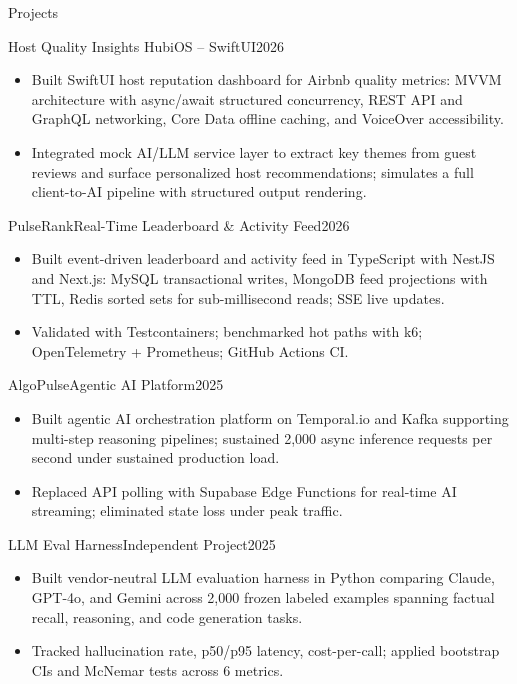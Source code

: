 \documentclass[]{mcdowellcv}
\begin{document}
\begin{cvsection}{Projects}
  \begin{cvsubsection}{Host Quality Insights Hub}{iOS -- SwiftUI}{2026}
    \begin{itemize}
      \item Built SwiftUI host reputation dashboard for Airbnb quality metrics: MVVM architecture with async/await structured concurrency, REST API and GraphQL networking, Core Data offline caching, and VoiceOver accessibility.
      \item Integrated mock AI/LLM service layer to extract key themes from guest reviews and surface personalized host recommendations; simulates a full client-to-AI pipeline with structured output rendering.
    \end{itemize}
    \vspace{-1.5pt}
  \end{cvsubsection}

  \begin{cvsubsection}{PulseRank}{Real-Time Leaderboard \& Activity Feed}{2026}
    \begin{itemize}
      \item Built event-driven leaderboard and activity feed in TypeScript with NestJS and Next.js: MySQL transactional writes, MongoDB feed projections with TTL, Redis sorted sets for sub-millisecond reads; SSE live updates.
      \item Validated with Testcontainers; benchmarked hot paths with k6; OpenTelemetry + Prometheus; GitHub Actions CI.
    \end{itemize}
    \vspace{-1.5pt}
  \end{cvsubsection}

  \begin{cvsubsection}{AlgoPulse}{Agentic AI Platform}{2025}
    \begin{itemize}
      \item Built agentic AI orchestration platform on Temporal.io and Kafka supporting multi-step reasoning pipelines; sustained 2,000 async inference requests per second under sustained production load.
      \item Replaced API polling with Supabase Edge Functions for real-time AI streaming; eliminated state loss under peak traffic.
    \end{itemize}
    \vspace{-1.5pt}
  \end{cvsubsection}

  \begin{cvsubsection}{LLM Eval Harness}{Independent Project}{2025}
    \begin{itemize}
      \item Built vendor-neutral LLM evaluation harness in Python comparing Claude, GPT-4o, and Gemini across 2,000 frozen labeled examples spanning factual recall, reasoning, and code generation tasks.
      \item Tracked hallucination rate, p50/p95 latency, cost-per-call; applied bootstrap CIs and McNemar tests across 6 metrics.
    \end{itemize}
  \end{cvsubsection}
\end{cvsection}
\end{document}
